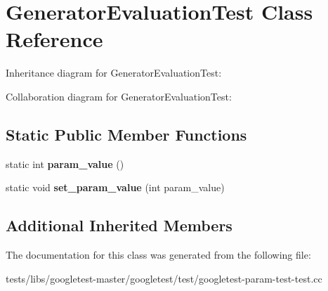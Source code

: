 \hypertarget{classGeneratorEvaluationTest}{}\section{Generator\+Evaluation\+Test Class Reference}
\label{classGeneratorEvaluationTest}


Inheritance diagram for Generator\+Evaluation\+Test\+:


Collaboration diagram for Generator\+Evaluation\+Test\+:
\subsection*{Static Public Member Functions}
\begin{DoxyCompactItemize}
\item 
\mbox{\label{classGeneratorEvaluationTest_ac819769e32b738677401424deb3c8cbe}} 
static int {\bfseries param\+\_\+value} ()
\item 
\mbox{\label{classGeneratorEvaluationTest_ae4f5fb96577dd680d9fa1fd6c3c4af46}} 
static void {\bfseries set\+\_\+param\+\_\+value} (int param\+\_\+value)
\end{DoxyCompactItemize}
\subsection*{Additional Inherited Members}


The documentation for this class was generated from the following file\+:\begin{DoxyCompactItemize}
\item 
tests/libs/googletest-\/master/googletest/test/googletest-\/param-\/test-\/test.\+cc\end{DoxyCompactItemize}
